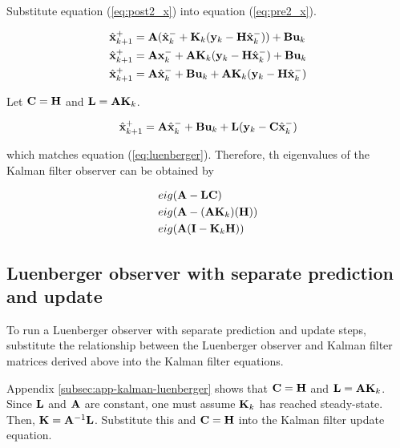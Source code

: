 Substitute equation (\ref{eq:post2_x}) into equation (\ref{eq:pre2_x}).

\begin{align*}
  \hat{\mathbf{x}}_{k+1}^+ &= \mathbf{A}(\hat{\mathbf{x}}_k^- + \mathbf{K}_k(\mathbf{y}_k -
    \mathbf{H}\hat{\mathbf{x}}_k^-)) + \mathbf{B}\mathbf{u}_k \\
  \hat{\mathbf{x}}_{k+1}^+ &= \mathbf{A}\mathbf{x}_k^- + \mathbf{A}\mathbf{K}_k(\mathbf{y}_k -
    \mathbf{H}\hat{\mathbf{x}}_k^-) + \mathbf{B}\mathbf{u}_k \\
  \hat{\mathbf{x}}_{k+1}^+ &= \mathbf{A}\hat{\mathbf{x}}_k^- + \mathbf{B}\mathbf{u}_k +
    \mathbf{A}\mathbf{K}_k(\mathbf{y}_k - \mathbf{H}\hat{\mathbf{x}}_k^-)
\end{align*}

Let $\mathbf{C} = \mathbf{H}$ and $\mathbf{L} = \mathbf{A} \mathbf{K}_k$.

\begin{equation} \label{eq:app_kalman_leunberger}
  \hat{\mathbf{x}}_{k+1}^+ = \mathbf{A}\hat{\mathbf{x}}_k^- + \mathbf{B}\mathbf{u}_k + \mathbf{L}
    (\mathbf{y}_k - \mathbf{C}\hat{\mathbf{x}}_k^-)
\end{equation}

which matches equation (\ref{eq:luenberger}). Therefore, th eigenvalues of the
Kalman filter observer can be obtained by

\begin{align}
  &eig(\mathbf{A} - \mathbf{L}\mathbf{C}) \nonumber \\
  &eig(\mathbf{A} - (\mathbf{A}\mathbf{K}_k)(\mathbf{H})) \nonumber \\
  &eig(\mathbf{A}(\mathbf{I} - \mathbf{K}_k\mathbf{H}))
\end{align}

\subsection{Luenberger observer with separate prediction and update}
\label{subsec:app-luenberger-separate}

To run a Luenberger observer with separate prediction and update steps,
substitute the relationship between the Luenberger observer and Kalman filter
matrices derived above into the Kalman filter equations.

Appendix \ref{subsec:app-kalman-luenberger} shows that $\mathbf{C} = \mathbf{H}$ and
$\mathbf{L} = \mathbf{A}\mathbf{K}_k$. Since $\mathbf{L}$ and $\mathbf{A}$ are constant, one
must assume $\mathbf{K}_k$ has reached steady-state. Then,
$\mathbf{K} = \mathbf{A}^{-1}\mathbf{L}$. Substitute this and $\mathbf{C} = \mathbf{H}$ into
the Kalman filter update equation.

